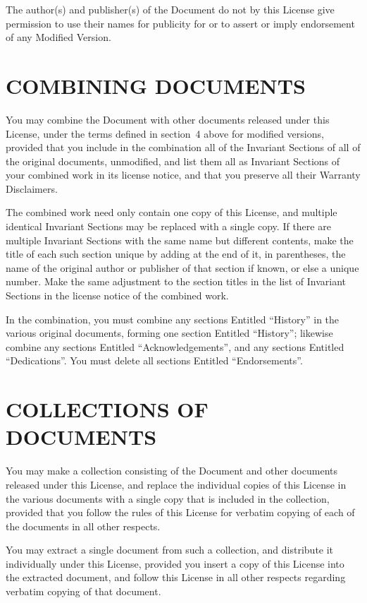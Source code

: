 The author(s) and publisher(s) of the Document do not by this License
give permission to use their names for publicity for or to assert or
imply endorsement of any Modified Version.


\section{COMBINING DOCUMENTS}

You may combine the Document with other documents released under this
License, under the terms defined in section~4 above for modified
versions, provided that you include in the combination all of the
Invariant Sections of all of the original documents, unmodified, and
list them all as Invariant Sections of your combined work in its
license notice, and that you preserve all their Warranty Disclaimers.

The combined work need only contain one copy of this License, and
multiple identical Invariant Sections may be replaced with a single
copy.  If there are multiple Invariant Sections with the same name but
different contents, make the title of each such section unique by
adding at the end of it, in parentheses, the name of the original
author or publisher of that section if known, or else a unique number.
Make the same adjustment to the section titles in the list of
Invariant Sections in the license notice of the combined work.

In the combination, you must combine any sections Entitled ``History''
in the various original documents, forming one section Entitled
``History''; likewise combine any sections Entitled ``Acknowledgements'',
and any sections Entitled ``Dedications''.  You must delete all sections
Entitled ``Endorsements''.


\section{COLLECTIONS OF DOCUMENTS}

You may make a collection consisting of the Document and other documents
released under this License, and replace the individual copies of this
License in the various documents with a single copy that is included in
the collection, provided that you follow the rules of this License for
verbatim copying of each of the documents in all other respects.

You may extract a single document from such a collection, and distribute
it individually under this License, provided you insert a copy of this
License into the extracted document, and follow this License in all
other respects regarding verbatim copying of that document.


